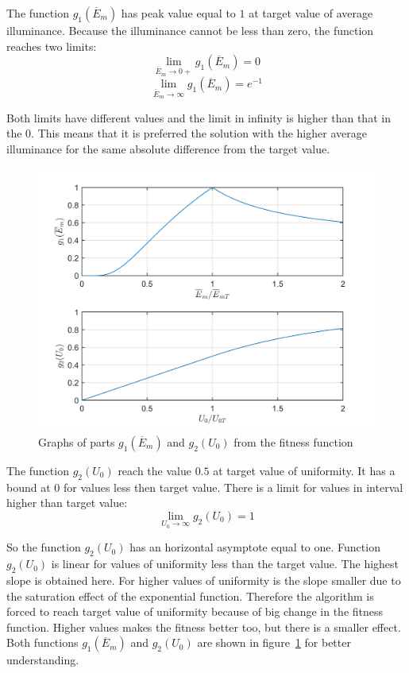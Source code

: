 The function $g_1\left(\overline{E}_{m}\right)$ has peak value equal to $1$ at target value of average illuminance. Because the illuminance cannot be less than zero, the function reaches two limits:
\begin{equation}
\label{eq:g1lim0}
\lim_{\overline{E}_{m}\to 0+} g_1\left(\overline{E}_{m}\right) = 0
\end{equation}
\begin{equation}
\label{eq:g1limInf}
\lim_{\overline{E}_{m}\to \infty} g_1\left(\overline{E}_{m}\right) = e^{-1}
\end{equation}

Both limits have different values and the limit in infinity is higher than that in the $0$. This means that it is preferred the solution with the higher average illuminance for the same absolute difference from the target value.

\begin{figure}[htb]
  \centering
  \includegraphics[width=\columnwidth]{obrG1G2}
  \caption{Graphs of parts $g_1\left(\overline{E}_{m}\right)$ and $g_2\left(U_0\right)$ from the fitness function}
  \label{fig:fitG1G2}
\end{figure}

The function $g_2\left(U_{0}\right)$ reach the value $0.5$ at target value of uniformity. It has a bound at $0$ for values less then target value. There is a limit for values in interval higher than target value:
\begin{equation}
\label{eq:g2limInf}
\lim_{U_{0}\to \infty} g_2\left(U_{0}\right) = 1
\end{equation}

So the function $g_2\left(U_{0}\right)$ has an horizontal asymptote equal to one. Function $g_2\left(U_{0}\right)$ is linear for values of uniformity less than the target value. The highest slope is obtained here. For higher values of uniformity is the slope smaller due to the saturation effect of the exponential function. Therefore the algorithm is forced to reach target value of uniformity because of big change in the fitness function. Higher values makes the fitness better too, but there is a smaller effect.
Both functions $g_1\left(\overline{E}_{m}\right)$ and $g_2\left(U_{0}\right)$ are shown in figure~\ref{fig:fitG1G2} for better understanding.